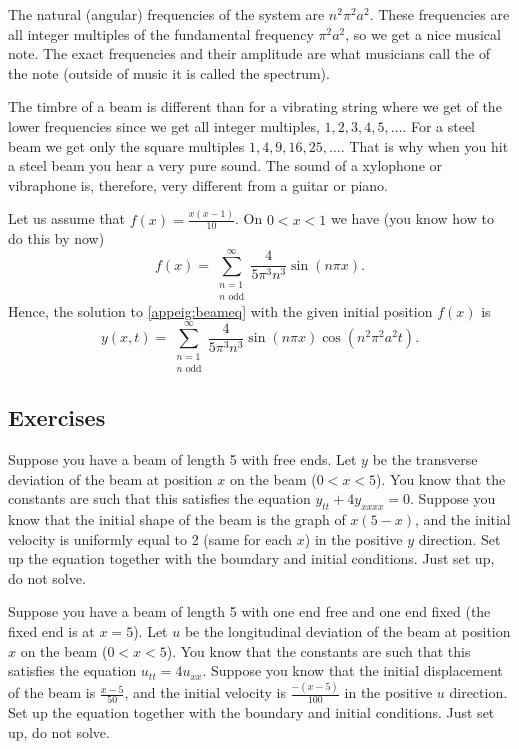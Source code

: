 The natural (angular) frequencies of the system are $n^2 \pi^2 a^2$.
These frequencies are all integer multiples of the fundamental frequency
$\pi^2 a^2$, so we get a nice musical note.  The exact frequencies
and their amplitude
are what musicians call the \emph{} of the note (outside
of music it is called the spectrum).

The timbre of a beam
is different than for a vibrating string where we get 
of the lower frequencies since we get all integer multiples,
$1,2,3,4,5,\ldots$.  For a steel beam we get
only the square multiples $1,4,9,16,25,\ldots$.  That is why when you hit a
steel beam you hear a very pure sound.  The sound of a
xylophone or vibraphone is, therefore, very different from a guitar or piano.

\begin{example}
Let us assume that $f(x) = \frac{x(x-1)}{10}$.  
On $0 < x < 1$ we have (you know how to do this by now)
\begin{equation*}
f(x) = \sum_{\substack{n=1\\n \text{~odd}}}^\infty \frac{4}{5\pi^3 n^3}
\sin (n \pi x) .
\end{equation*}
Hence, the solution to \eqref{appeig:beameq} with the given initial
position $f(x)$ is
\begin{equation*}
y(x,t) = \sum_{\substack{n=1\\n \text{~odd}}}^\infty \frac{4}{5\pi^3 n^3}
\sin (n \pi x) \cos ( n^2 \pi^2 a^2 t ) .
\end{equation*}
\end{example}

\subsection{Exercises}

\begin{exercise}
Suppose you have a beam of length 5 with free ends.  Let $y$ be the
transverse deviation of the beam at position $x$ on the beam ($0 < x < 5$).
You know that the
constants are such that this satisfies the equation $y_{tt} + 4 y_{xxxx} =
0$.   Suppose you know that the initial shape of the beam is the graph of
$x(5-x)$, and the initial velocity is uniformly equal to 2 (same for each $x$)
in the positive $y$ direction.  Set up the equation together with the
boundary and initial conditions.  Just set up, do not solve.
\end{exercise}

\begin{exercise}
Suppose you have a beam of length 5 with one end free and one end fixed
(the fixed end is at $x=5$).
Let $u$ be the
longitudinal deviation of the beam at position $x$ on the beam ($0 < x < 5$).
You know that the
constants are such that this satisfies the equation $u_{tt} = 4 u_{xx}$.
Suppose you know that the initial displacement of the beam
is $\frac{x-5}{50}$, and the initial velocity is $\frac{-(x-5)}{100}$
in the positive $u$ direction.  Set up the equation together with the
boundary and initial conditions.  Just set up, do not solve.
\end{exercise}


